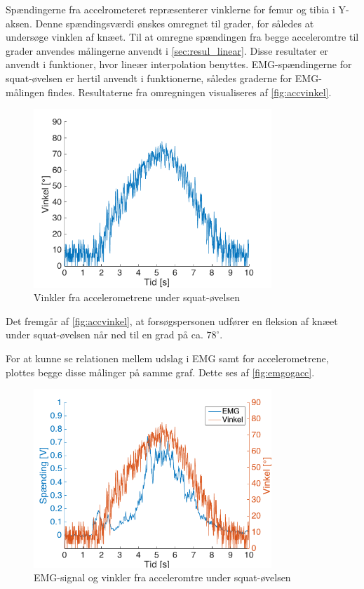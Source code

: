 Spændingerne fra accelrometeret repræsenterer vinklerne for femur og tibia i Y-aksen. Denne spændingsværdi ønskes omregnet til grader, for således at undersøge vinklen af knæet. Til at omregne spændingen fra begge acceleromtre til grader anvendes målingerne anvendt i \autoref{sec:resul_linear}. Disse resultater er anvendt i funktioner, hvor lineær interpolation benyttes. EMG-spændingerne for squat-øvelsen er hertil anvendt i funktionerne, således graderne for EMG-målingen findes.
Resultaterne fra omregningen visualiseres af \autoref{fig:accvinkel}. 

\begin{figure}[H]
	\centering
	\includegraphics[width=0.8\textwidth]{figures/Pilotforsoeg/accvinkel}
	\caption{Vinkler fra accelerometrene under squat-øvelsen}
	\label{fig:accvinkel}
\end{figure}
Det fremgår af \autoref{fig:accvinkel}, at forsøgspersonen udfører en fleksion af knæet under squat-øvelsen når ned til en grad på ca. $78^{\circ}$. 

For at kunne se relationen mellem udslag i EMG samt for accelerometrene, plottes begge disse målinger på samme graf. Dette ses af \autoref{fig:emgogacc}. 
\begin{figure}[H]
	\centering
	\includegraphics[width=0.8\textwidth]{figures/Pilotforsoeg/emg_vinkler_tid}
	\caption{EMG-signal og vinkler fra acceleromtre under squat-øvelsen}
	\label{fig:emgogacc}
\end{figure}


